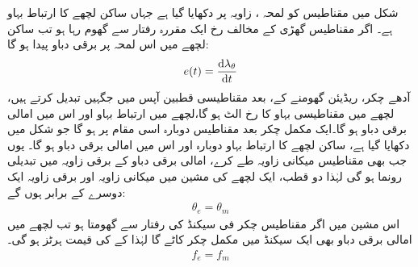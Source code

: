  شکل   میں مقناطیس کو لمحہ ،  زاویہ  پر دکھایا گیا ہے جہاں ساکن لچھے کا ارتباط بہاو  ہے۔ اگر مقناطیس گھڑی کے مخالف رخ ایک مقررہ رفتار  سے  گھوم رہا ہو تب ساکن لچھے میں اس لمحہ پر برقی دباو  پیدا ہو گا:
\begin{align}
e(t)=\frac{\dif \lambda_\theta}{\dif t}
\end{align}
آدھے چکر،  ریڈیئن  گھومنے کے،  بعد  مقناطیسی  قطبین آپس میں جگہیں تبدیل کرتے ہیں، لچھے میں مقناطیسی بہاو کا رخ الٹ ہو گا،لچھے میں ارتباط بہاو   اور اس میں امالی برقی دباو  ہو گا۔ایک مکمل چکر بعد مقناطیس  دوبارہ اسی مقام پر ہو گا جو شکل  میں دکھایا گیا ہے، ساکن لچھے کا ارتباط بہاو دوبارہ  اور اس میں امالی برقی دباو  ہو گا۔ یوں جب بھی مقناطیس    میکانی زاویہ طے کرے،  امالی برقی دباو کے  برقی زاویہ میں   تبدیلی رونما ہو گی  لہٰذا دو قطب، ایک لچھے  کی مشین میں میکانی زاویہ  اور برقی زاویہ   ایک دوسرے کے برابر ہوں گے:
\begin{align*}
\theta_e=\theta_m
\end{align*}
اس مشین میں اگر مقناطیس  چکر فی سیکنڈ کی رفتار سے گھومتا ہو تب لچھے میں امالی برقی دباو  بھی ایک سیکنڈ میں  مکمل چکر کاٹے گا لہٰذا   کے     کی قیمت   ہرٹز ہو گی۔
\begin{align*}
f_e=f_m
\end{align*}
%
